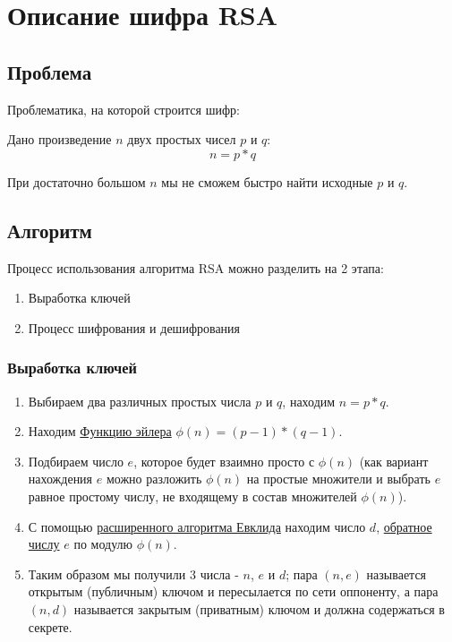 \documentclass[12pt,a4paper]{scrartcl}
\begin{document}
\section{Описание шифра RSA}

\subsection{Проблема}

Проблематика, на которой строится шифр:

Дано произведение $n$ двух простых чисел $p$ и $q$: $$n=p*q$$

При достаточно большом $n$ мы не сможем быстро найти исходные $p$ и $q$.

\subsection{Алгоритм}

Процесс использования алгоритма RSA можно разделить на 2 этапа:

\begin{enumerate}
	\item Выработка ключей
	\item Процесс шифрования и дешифрования
\end{enumerate}

\subsubsection{Выработка ключей}

\begin{enumerate}
	\item Выбираем два различных простых числа $p$ и $q$, находим $n=p*q$.
	\item Находим \href{https://yatb.kksctf.ru/}{Функцию эйлера} $\phi(n)=(p-1)*(q-1)$.
	\item Подбираем число $e$, которое будет взаимно просто с $\phi(n)$ (как вариант нахождения $e$ можно разложить $\phi(n)$ на простые множители и выбрать $e$ равное простому числу, не входящему в состав множителей $\phi(n)$).
	\item С помощью \href{https://yatb.kksctf.ru/}{расширенного алгоритма Евклида} находим число $d$, \href{https://yatb.kksctf.ru/}{обратное числу} $e$  по модулю $\phi(n)$.
	\item Таким образом мы получили 3 числа - $n$, $e$ и $d$; пара $(n,e)$ называется открытым (публичным) ключом и пересылается по сети оппоненту, а пара $(n,d)$ называется закрытым (приватным) ключом и должна содержаться в секрете.
\end{enumerate}
\end{document}
